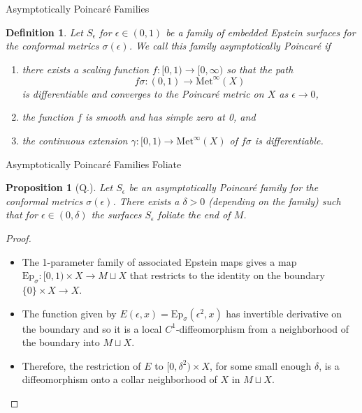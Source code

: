 \documentclass[professionalfont]{beamer}
\newtheorem*{prop*}{Proposition}
\newtheorem{defn}{Definition}
\begin{document}


\begin{frame}{Asymptotically Poincar\'e Families}

\begin{defn}
\label{asym-def}
Let $S_\epsilon$ for $\epsilon \in (0,1)$ be a family of embedded Epstein surfaces for the conformal metrics $\sigma(\epsilon)$. 
We call this family \emph{asymptotically Poincar\'e} if \pause
\begin{enumerate}
    \item there exists a scaling function $f:[0,1) \to [0,\infty)$ so that the path
    \[
f\sigma:(0,1) \to \mathrm{Met}^\infty(X)
\]
is differentiable and converges to the Poincar\'e metric on $X$ as $\epsilon \to 0$, \pause
    \item the function $f$ is smooth and has simple zero at 0, and \pause
    \item the continuous extension $\gamma:[0,1) \to \mathrm{Met}^\infty(X)$ of $f \sigma$ is differentiable.
\end{enumerate}

\end{defn}

\end{frame}




\begin{frame}{Asymptotically Poincar\'e Families Foliate}

\begin{prop*}[Q.]
Let $S_\epsilon$ be an asymptotically Poincar\'e family for the conformal metrics $\sigma(\epsilon)$. There exists a $\delta > 0$ (depending on the family) such that for $\epsilon \in (0,\delta)$ the surfaces $S_\epsilon$ foliate the end of $M$.
\end{prop*} \pause

\begin{proof}

\begin{itemize}

\item The 1-parameter family of associated Epstein maps gives a map $\mathrm{Ep}_{\sigma}: [0,1) \times X \to M \sqcup X$ that restricts to the identity on the boundary $\{ 0 \} \times X \to X$. \pause

\item The function given by $E(\epsilon,x) = \mathrm{Ep}_\sigma(\epsilon^2,x)$ has invertible derivative on the boundary and so it is a local $C^1$-diffeomorphism from a neighborhood of the boundary into $M \sqcup X$. \pause

\item Therefore, the restriction of $E$ to $[0, \delta^2) \times X$, for some small
enough $\delta$, is a diffeomorphism onto a collar neighborhood of $X$ in $M \sqcup X$.

\end{itemize}

\end{proof}

\end{frame}
\end{document}
